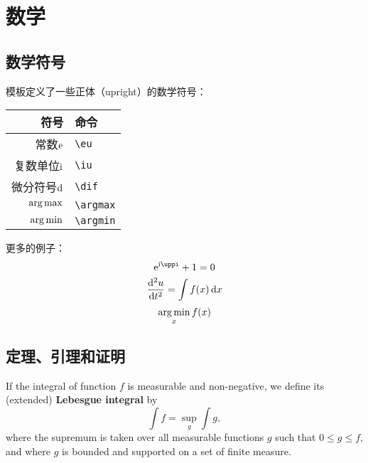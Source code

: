 \chapter{数学}

\section{数学符号}

模板定义了一些正体（upright）的数学符号：
\begin{center}
\begin{tabular}{rl}
  \toprule
    符号                 & 命令 \\
  \midrule
    常数$\mathrm{e}$     & \verb|\eu| \\
    复数单位$\mathrm{i}$ & \verb|\iu| \\
    微分符号$\mathop{}\!\mathrm{d}$ & \verb|\dif| \\
    $\operatorname*{arg\,max}$         & \verb|\argmax| \\
    $\operatorname*{arg\,min}$         & \verb|\argmin| \\
  \bottomrule
\end{tabular}
\end{center}

更多的例子：
\begin{equation}
  \eu^{\iu\uppi} + 1 = 0
\end{equation}
\begin{equation}
  \frac{\mathop{}\!\mathrm{d}^2 u}{\mathop{}\!\mathrm{d} t^2} = \int f(x) \mathop{}\!\mathrm{d} x
\end{equation}
\begin{equation}
  \operatorname*{arg\,min}_x f(x)
\end{equation}

\section{定理、引理和证明}

\newcommand\real{\mathbf{R}}

\begin{definition}
    If the integral of function $f$ is measurable and non-negative, we define
    its (extended) \textbf{Lebesgue integral} by
    \begin{equation}
        \int f = \sup_g \int g,
    \end{equation}
    where the supremum is taken over all measurable functions $g$ such that
    $0 \le g \le f$, and where $g$ is bounded and supported on a set of
    finite measure.
\end{definition}

